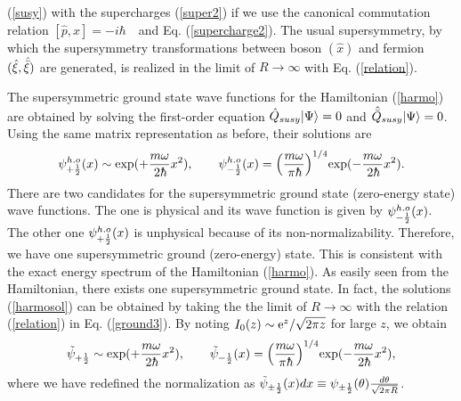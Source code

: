 \documentclass[a4paper,12pt]{article}
\begin{document}
(\ref{susy}) with the supercharges (\ref{super2}) if we use the 
canonical commutation relation $[{\hat p},{\hat x}]=-i\hbar$~~and 
Eq. (\ref{supercharge2}). The usual supersymmetry, by which the supersymmetry 
transformations between boson $({\hat x})$ and fermion $(\hat\xi, \hat{\bar\xi})$ 
are generated, is realized 
in the limit of $R\rightarrow \infty$ with Eq. (\ref{relation}). 
\par
The supersymmetric ground state wave functions for the Hamiltonian
(\ref{harmo}) are obtained by solving the first-order equation
$\hat Q_{susy}|{\Psi}\rangle=0$ and $\hat{\bar Q}_{susy}|{\Psi}\rangle=0$. Using the
same matrix representation as before, their solutions are
\begin{equation}
{\psi}_{+\half}^{h.o}(x)\sim {\rm exp}(+{{m\omega}\over {2\hbar}} x^2),
\qquad
{\psi}_{-\half}^{h.o}(x)= \Bigl({{m\omega}\over {\pi\hbar}}\Bigr)^{1/4}
{\rm exp}(-{{m\omega}\over {2\hbar}} x^2). 
\label{harmosol}
\end{equation}
There are two candidates for the supersymmetric ground 
state (zero-energy state) wave functions. 
The one is physical and its wave function is given 
by ${\psi}_{-{1\over2}}^{h.o}(x)$. The other 
one ${\psi}_{+{1\over2}}^{h.o}(x)$ is unphysical because of its 
non-normalizability. Therefore, we have one supersymmetric 
ground (zero-energy) state. This is consistent with the exact energy 
spectrum of the Hamiltonian (\ref{harmo}). As easily seen from the 
Hamiltonian, there exists one supersymmetric ground state.
In fact, the solutions (\ref{harmosol}) can be obtained by taking the 
the limit of $R\rightarrow \infty$ with the relation (\ref{relation}) 
in Eq. (\ref{ground3}). 
By noting $I_0(z)\sim {\rm e}^z/\sqrt{2\pi z}$ for large $z$,
we obtain
\begin{equation}
{\tilde\psi}_{+\half}\sim {\rm exp}(+{{m\omega}\over {2\hbar}} x^2),\qquad
{\tilde\psi}_{-\half}(x)= \Bigl({{m\omega}\over {\pi\hbar}}\Bigr)^{1/4}
{\rm exp}(-{{m\omega}\over {2\hbar}} x^2),
\end{equation}
where we have redefined the normalization as 
${\tilde\psi}_{\pm {1\over2}}(x)dx\equiv 
\psi_{\pm {1\over2}}(\theta){{d\theta}\over{\sqrt{2\pi R}}}$. 
\end{document}
